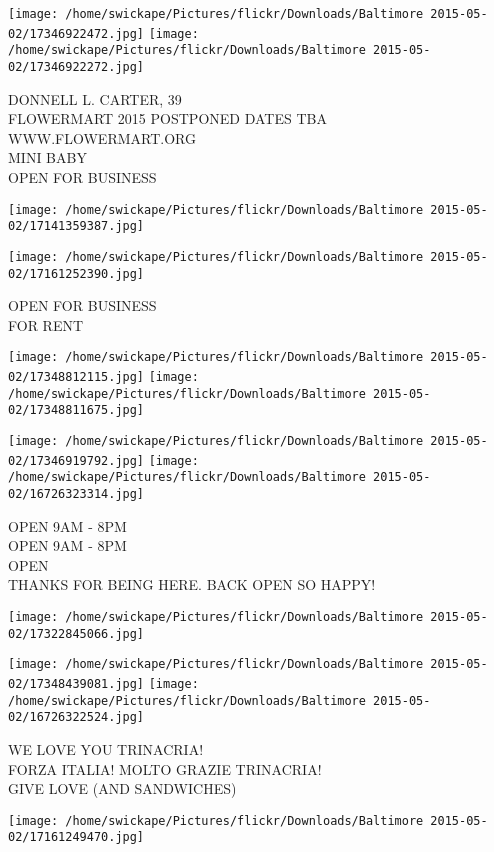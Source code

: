 \documentclass[10pt,letterpaper]{article}
\begin{document}
\texttt{[image: /home/swickape/Pictures/flickr/Downloads/Baltimore 2015-05-02/17346922472.jpg]}
\texttt{[image: /home/swickape/Pictures/flickr/Downloads/Baltimore 2015-05-02/17346922272.jpg]}

DONNELL L. CARTER, 39\\
FLOWERMART 2015 POSTPONED DATES TBA WWW.FLOWERMART.ORG\\
MINI BABY\\
OPEN FOR BUSINESS
\pagebreak

\texttt{[image: /home/swickape/Pictures/flickr/Downloads/Baltimore 2015-05-02/17141359387.jpg]}

\vspace{0.25in}
\texttt{[image: /home/swickape/Pictures/flickr/Downloads/Baltimore 2015-05-02/17161252390.jpg]}

OPEN FOR BUSINESS\\
FOR RENT
\pagebreak

\texttt{[image: /home/swickape/Pictures/flickr/Downloads/Baltimore 2015-05-02/17348812115.jpg]}
\texttt{[image: /home/swickape/Pictures/flickr/Downloads/Baltimore 2015-05-02/17348811675.jpg]}

\texttt{[image: /home/swickape/Pictures/flickr/Downloads/Baltimore 2015-05-02/17346919792.jpg]}
\texttt{[image: /home/swickape/Pictures/flickr/Downloads/Baltimore 2015-05-02/16726323314.jpg]}

OPEN 9AM {-} 8PM\\
OPEN 9AM {-} 8PM\\
OPEN\\
THANKS FOR BEING HERE.  BACK OPEN SO HAPPY!
\pagebreak

\texttt{[image: /home/swickape/Pictures/flickr/Downloads/Baltimore 2015-05-02/17322845066.jpg]}

\vspace{0.25in}
\texttt{[image: /home/swickape/Pictures/flickr/Downloads/Baltimore 2015-05-02/17348439081.jpg]}
\texttt{[image: /home/swickape/Pictures/flickr/Downloads/Baltimore 2015-05-02/16726322524.jpg]}

WE LOVE YOU TRINACRIA!\\
FORZA ITALIA!  MOLTO GRAZIE TRINACRIA!\\
GIVE LOVE (AND SANDWICHES)
\pagebreak

\texttt{[image: /home/swickape/Pictures/flickr/Downloads/Baltimore 2015-05-02/17161249470.jpg]}
\end{document}
